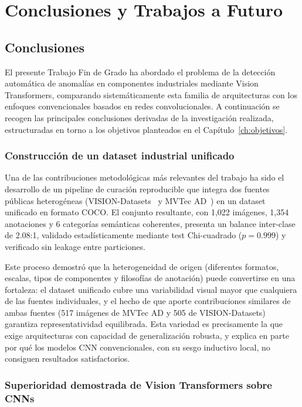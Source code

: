 \chapter{Conclusiones y Trabajos a Futuro}
\label{ch:conclusiones}

\section{Conclusiones}
\label{sec:conclusiones}

El presente Trabajo Fin de Grado ha abordado el problema de la detección automática de anomalías en componentes industriales mediante Vision Transformers, comparando sistemáticamente esta familia de arquitecturas con los enfoques convencionales basados en redes convolucionales. A continuación se recogen las principales conclusiones derivadas de la investigación realizada, estructuradas en torno a los objetivos planteados en el Capítulo~\ref{ch:objetivos}.

\subsection{Construcción de un dataset industrial unificado}

Una de las contribuciones metodológicas más relevantes del trabajo ha sido el desarrollo de un pipeline de curación reproducible que integra dos fuentes públicas heterogéneas (VISION-Datasets~\cite{bai2023visiondatasets} y MVTec AD~\cite{bergmann2019mvtec}) en un dataset unificado en formato COCO. El conjunto resultante, con 1{,}022 imágenes, 1{,}354 anotaciones y 6 categorías semánticas coherentes, presenta un balance inter-clase de 2.08:1, validado estadísticamente mediante test Chi-cuadrado ($p = 0.999$) y verificado sin leakage entre particiones.

Este proceso demostró que la heterogeneidad de origen (diferentes formatos, escalas, tipos de componentes y filosofías de anotación) puede convertirse en una fortaleza: el dataset unificado cubre una variabilidad visual mayor que cualquiera de las fuentes individuales, y el hecho de que aporte contribuciones similares de ambas fuentes (517 imágenes de MVTec AD y 505 de VISION-Datasets) garantiza representatividad equilibrada. Esta variedad es precisamente la que exige arquitecturas con capacidad de generalización robusta, y explica en parte por qué los modelos CNN convencionales, con su sesgo inductivo local, no consiguen resultados satisfactorios.

\subsection{Superioridad demostrada de Vision Transformers sobre CNNs}

